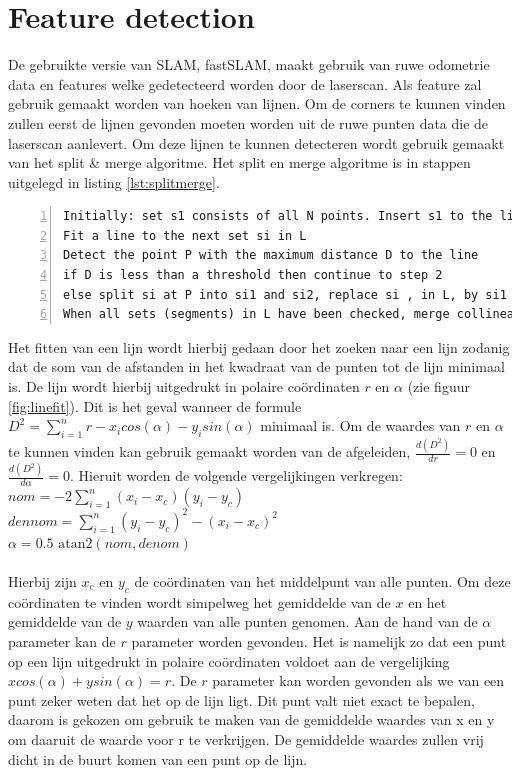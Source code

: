 \documentclass[a4paper]{article}
\begin{document}
\section{Feature detection}
\label{sec:featdetc}
De gebruikte versie van SLAM, fastSLAM, maakt gebruik van ruwe odometrie data en features welke gedetecteerd worden door de laserscan.
Als feature zal gebruik gemaakt worden van hoeken van lijnen. Om de corners te kunnen vinden zullen eerst de lijnen gevonden moeten worden uit de ruwe punten data die de laserscan aanlevert. Om deze lijnen te kunnen detecteren wordt gebruik gemaakt van het split \& merge algoritme. Het split en merge algoritme is in stappen uitgelegd in listing \ref{lst:splitmerge}.

\begin{lstlisting}[caption= Split \& merge algorithm, label=lst:splitmerge, numbers=left]
Initially: set s1 consists of all N points. Insert s1 to the list L. Set index i=1
Fit a line to the next set si in L
Detect the point P with the maximum distance D to the line
if D is less than a threshold then continue to step 2
else split si at P into si1 and si2, replace si , in L, by si1 and si2. Continue to step 2
When all sets (segments) in L have been checked, merge collinear segments.
\end{lstlisting}

\noindent Het fitten van een lijn wordt hierbij gedaan door het zoeken naar een lijn zodanig dat de som van de afstanden in het kwadraat van de punten tot de lijn minimaal is. De lijn wordt hierbij uitgedrukt in polaire co\"ordinaten $r$ en $\alpha$ (zie figuur \ref{fig:linefit}). 
Dit is het geval wanneer de formule $D^2 = \sum\limits_{i=1}^n r-x_i cos(\alpha) - y_i sin(\alpha)$ minimaal is. Om de waardes van $r$ en $\alpha$ te kunnen vinden kan gebruik gemaakt worden van de afgeleiden, $\frac{d(D^2)}{dr} = 0$ en $\frac{d(D^2)}{d\alpha} = 0$.
Hieruit worden de volgende vergelijkingen verkregen:\\
$nom =  -2\sum\limits_{i=1}^n (x_i - x_c)(y_i - y_c)$\\
$dennom =  \sum\limits_{i=1}^n (y_i - y_c)^2 - (x_i - x_c)^2$\\
$\alpha = 0.5\mbox{ atan2}(nom, denom)$\\\\
Hierbij zijn $x_c$ en $y_c$ de co\"ordinaten van het middelpunt van alle punten. Om deze co\"ordinaten te vinden wordt simpelweg het gemiddelde van de $x$ en het gemiddelde van de $y$ waarden van alle punten genomen. Aan de hand van de $\alpha$ parameter kan de $r$ parameter worden gevonden.
Het is namelijk zo dat een punt op een lijn uitgedrukt in polaire co\"ordinaten voldoet aan de vergelijking $x cos(\alpha) + y sin(\alpha) = r$. De $r$ parameter kan worden gevonden als we van een punt zeker weten dat het op de lijn ligt. Dit punt valt niet exact te bepalen, daarom is gekozen om gebruik te maken van de gemiddelde waardes van x en y om daaruit de waarde voor r te verkrijgen. De gemiddelde waardes zullen vrij dicht in de buurt komen van een punt op de lijn.
\end{document}
